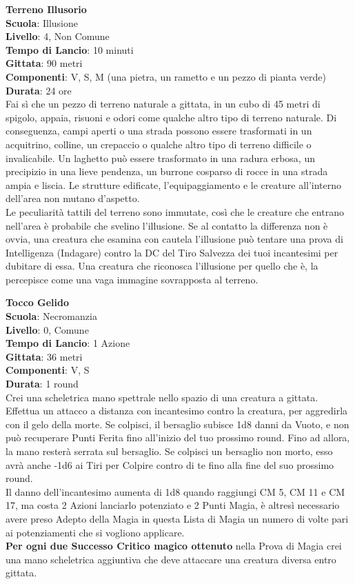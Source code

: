 \begin{multicols}{2}
\medskip\textbf{Terreno Illusorio}\\
\textbf{Scuola}: Illusione\\
\textbf{Livello}: 4, Non Comune\\
\textbf{Tempo di Lancio}: 10 minuti\\
\textbf{Gittata}: 90 metri\\
\textbf{Componenti}: V, S, M (una pietra, un rametto e un pezzo di pianta verde)\\
\textbf{Durata}: 24 ore \\
Fai sì che un pezzo di terreno naturale a gittata, in un cubo di 45 metri di spigolo, appaia, risuoni e odori come qualche altro tipo di terreno naturale. Di conseguenza, campi aperti o una strada possono essere trasformati in un acquitrino, colline, un crepaccio o qualche altro tipo di terreno difficile o invalicabile. Un laghetto può essere trasformato in una radura erbosa, un precipizio in una lieve pendenza, un burrone cosparso di rocce in una strada ampia e liscia. Le strutture edificate, l'equipaggiamento e le creature all'interno dell'area non mutano d'aspetto.\\
Le peculiarità tattili del terreno sono immutate, così che le creature che entrano nell'area è probabile che svelino l'illusione. Se al contatto la differenza non è ovvia, una creatura che esamina con cautela l'illusione può tentare una prova di Intelligenza (Indagare) contro la DC del Tiro Salvezza dei tuoi incantesimi per dubitare di essa. Una creatura che riconosca l'illusione per quello che è, la percepisce come una vaga immagine sovrapposta al terreno.

\medskip\textbf{Tocco Gelido}\\
\textbf{Scuola}: Necromanzia\\
\textbf{Livello}: 0, Comune\\
\textbf{Tempo di Lancio}: 1 Azione\\
\textbf{Gittata}: 36 metri\\
\textbf{Componenti}: V, S\\
\textbf{Durata}: 1 round\\
Crei una scheletrica mano spettrale nello spazio di una creatura a gittata. Effettua un attacco a distanza con incantesimo contro la creatura, per aggredirla con il gelo della morte. Se colpisci, il bersaglio subisce 1d8 danni da Vuoto, e non può recuperare Punti Ferita fino all'inizio del tuo prossimo round. Fino ad allora, la mano resterà serrata sul bersaglio. Se colpisci un bersaglio non morto, esso avrà anche -1d6 ai Tiri per Colpire contro di te fino alla fine del suo prossimo round.\\
Il danno dell'incantesimo aumenta di 1d8 quando raggiungi CM 5, CM 11 e CM 17, ma costa 2 Azioni lanciarlo potenziato e 2 Punti Magia, è altresì necessario avere preso Adepto della Magia in questa Lista di Magia un numero di volte pari ai potenziamenti che si vogliono applicare.\\
\textbf{Per ogni due Successo Critico magico ottenuto} nella Prova di Magia crei una mano scheletrica aggiuntiva che deve attaccare una creatura diversa entro gittata.


\end{multicols}
